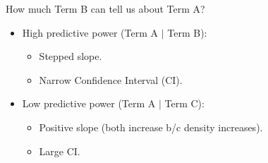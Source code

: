 \documentclass[aspectratio=169, 9pt]{beamer}
\begin{document}
\begin{frame}[c]
	
	\begin{minipage}[t]{.48\linewidth}
	\large\alert{How much Term B can tell us about Term A?}\normalsize\pause
	
	\begin{itemize}
		\item<2-> High predictive power (Term A $|$ Term B):
		\begin{itemize}
			\item<3-> Stepped slope.
			\item<3-> Narrow Confidence Interval (CI).
		\end{itemize}
		\item<4-> Low predictive power (Term A $|$ Term C):
		\begin{itemize}
			\item<5-> Positive slope (both increase b/c density increases).
			\item<5-> Large CI.
		\end{itemize}
	\end{itemize}
	\end{minipage}
\hfill
	\begin{minipage}[t]{.48\linewidth}
	\begin{figure}
\end{figure}
\end{minipage}
\end{frame}
\end{document}
